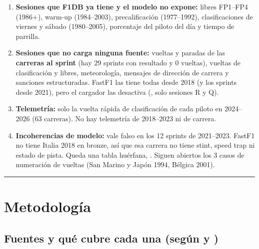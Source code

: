 \begin{enumerate}
\item \textbf{Sesiones que F1DB ya tiene y el modelo no expone:} libres FP1–FP4 (1986+), warm-up (1984–2003), precalificación (1977–1992), clasificaciones de viernes y sábado (1980–2005), porcentaje del piloto del día y tiempo de parrilla.
\item \textbf{Sesiones que no carga ninguna fuente:} vueltas y paradas de las \textbf{carreras al sprint} (hay 29 sprints con resultado y 0 vueltas), vueltas de clasificación y libres, meteorología, mensajes de dirección de carrera y sanciones estructuradas. FastF1 las tiene todas desde 2018 (y los sprints desde 2021), pero el cargador las desactiva (, solo sesiones R y Q).
\item \textbf{Telemetría:} solo la vuelta rápida de clasificación de cada piloto en 2024–2026 (63 carreras). No hay telemetría de 2018–2023 ni de carrera.
\item \textbf{Incoherencias de modelo:}  vale falso en los 12 sprints de 2021–2023. FastF1 no tiene Italia 2018 en bronze, así que esa carrera no tiene stint, speed trap ni estado de pista. Queda una tabla huérfana, . Siguen abiertos los 3 casos de numeración de vueltas (San Marino y Japón 1994, Bélgica 2001).
\end{enumerate}

\medskip\noindent\textcolor{muted!40}{\rule{\linewidth}{0.3pt}}\medskip

\section{Metodología}

\subsection{Fuentes y qué cubre cada una (según  y )}

